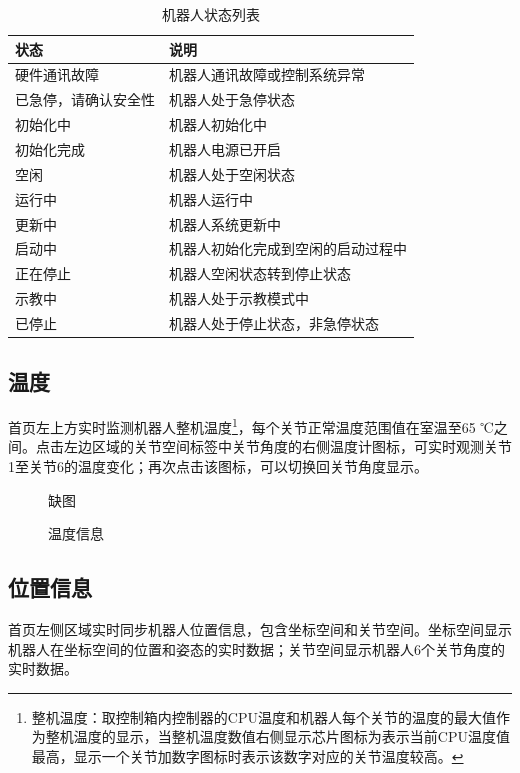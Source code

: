 \begin{table}[ht]
    \centering\small
    \begin{tabular}{|l|l|}\hline
\bf 状态 & \bf 说明\\\hline
硬件通讯故障 & 机器人通讯故障或控制系统异常\\\hline
已急停，请确认安全性 & 机器人处于急停状态\\\hline
初始化中 & 机器人初始化中\\\hline
初始化完成 & 机器人电源已开启\\\hline
空闲 & 机器人处于空闲状态\\\hline
运行中 & 机器人运行中\\\hline
更新中 & 机器人系统更新中\\\hline
启动中 & 机器人初始化完成到空闲的启动过程中\\\hline
正在停止 & 机器人空闲状态转到停止状态\\\hline
示教中 & 机器人处于示教模式中\\\hline
已停止 & 机器人处于停止状态，非急停状态\\\hline
    \end{tabular}
    \caption{机器人状态列表}
\end{table}

\subsection{温度}
\LM 首页左上方实时监测机器人整机温度\footnote{整机温度：取控制箱内控制器的CPU温度和机器人每个关节的温度的最大值作为整机温度的显示，当整机温度数值右侧显示芯片图标为表示当前CPU温度值最高，显示一个关节加数字图标时表示该数字对应的关节温度较高。}，每个关节正常温度范围值在室温至65 ℃之间。点击左边区域的关节空间标签中关节角度的右侧温度计图标，可实时观测关节1至关节6的温度变化；再次点击该图标，可以切换回关节角度显示。

\begin{figure}[ht]
	\centering
	\color{red}缺图
	\caption{温度信息}
	\label{fig:温度信息}
\end{figure}


\subsection{位置信息}
\LM 首页左侧区域实时同步机器人位置信息，包含坐标空间和关节空间。坐标空间显示机器人在坐标空间的位置和姿态的实时数据；关节空间显示机器人6个关节角度的实时数据。

